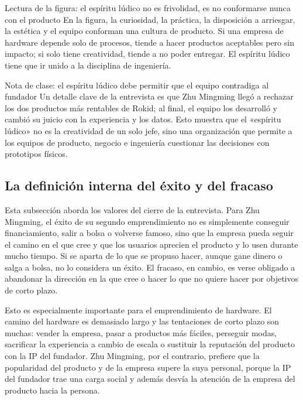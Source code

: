 \begin{knowledgebox}{Lectura de la figura: el espíritu lúdico no es frivolidad, es no conformarse nunca con el producto}
En la figura, la curiosidad, la práctica, la disposición a arriesgar, la estética y el equipo conforman una cultura de producto. Si una empresa de hardware depende solo de procesos, tiende a hacer productos aceptables pero sin impacto; si solo tiene creatividad, tiende a no poder entregar. El espíritu lúdico tiene que ir unido a la disciplina de ingeniería.
\end{knowledgebox}

\begin{knowledgebox}{Nota de clase: el espíritu lúdico debe permitir que el equipo contradiga al fundador}
Un detalle clave de la entrevista es que Zhu Mingming llegó a rechazar los dos productos más rentables de Rokid; al final, el equipo los desarrolló y cambió su juicio con la experiencia y los datos. Esto muestra que el «espíritu lúdico» no es la creatividad de un solo jefe, sino una organización que permite a los equipos de producto, negocio e ingeniería cuestionar las decisiones con prototipos físicos.
\end{knowledgebox}

\subsection{La definición interna del éxito y del fracaso}

Esta subsección aborda los valores del cierre de la entrevista. Para Zhu Mingming, el éxito de su segundo emprendimiento no es simplemente conseguir financiamiento, salir a bolsa o volverse famoso, sino que la empresa pueda seguir el camino en el que cree y que los usuarios aprecien el producto y lo usen durante mucho tiempo. Si se aparta de lo que se propuso hacer, aunque gane dinero o salga a bolsa, no lo considera un éxito. El fracaso, en cambio, es verse obligado a abandonar la dirección en la que cree o hacer lo que no quiere hacer por objetivos de corto plazo.

Esto es especialmente importante para el emprendimiento de hardware. El camino del hardware es demasiado largo y las tentaciones de corto plazo son muchas: vender la empresa, pasar a productos más fáciles, perseguir modas, sacrificar la experiencia a cambio de escala o sustituir la reputación del producto con la IP del fundador. Zhu Mingming, por el contrario, prefiere que la popularidad del producto y de la empresa supere la suya personal, porque la IP del fundador trae una carga social y además desvía la atención de la empresa del producto hacia la persona.

